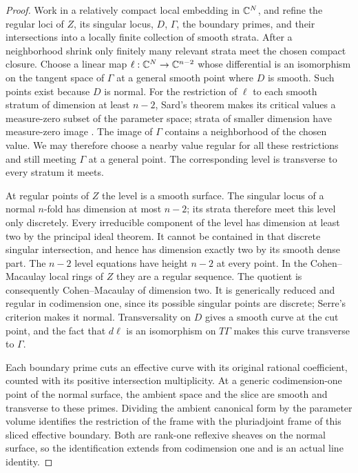 \begin{proof}
Work in a relatively compact local embedding in \(\mathbb C^N\), and refine
the regular loci of \(Z\), its singular locus, \(D\), \(\Gamma\), the
boundary primes, and their intersections into a locally finite collection
of smooth strata.  After a neighborhood shrink only finitely many relevant
strata meet the chosen compact closure.  Choose a linear map
\(\ell:\mathbb C^N\to\mathbb C^{n-2}\) whose differential is an isomorphism on
the tangent space of \(\Gamma\) at a general smooth point where \(D\)
is smooth.  Such points exist because \(D\) is normal.  For the restriction
of \(\ell\) to each smooth stratum of dimension at least \(n-2\),
Sard's theorem makes its critical values a measure-zero subset of the
parameter space; strata of smaller dimension have measure-zero image
\cite{Sard1942}.  The image of \(\Gamma\) contains a neighborhood of the
chosen value.  We may therefore choose a nearby value regular for all
these restrictions and still meeting \(\Gamma\) at a general point.
The corresponding level is transverse to every stratum it meets.

At regular points of \(Z\) the level is a smooth surface.  The singular
locus of a normal \(n\)-fold has dimension at most \(n-2\); its strata
therefore meet this level only discretely.  Every irreducible component
of the level has dimension at least two by the principal ideal theorem.
It cannot be contained in that discrete singular intersection, and hence
has dimension exactly two by its smooth dense part.  The \(n-2\) level
equations have height \(n-2\) at every point.  In the Cohen--Macaulay local
rings of \(Z\) they are a regular sequence.  The quotient is consequently
Cohen--Macaulay of dimension two.  It is generically reduced and regular
in codimension one, since its possible singular points are discrete;
Serre's criterion makes it normal.  Transversality on \(D\) gives a smooth
curve at the cut point, and the fact that \(d\ell\) is an isomorphism on
\(T\Gamma\) makes this curve transverse to \(\Gamma\).

Each boundary prime cuts an effective curve with its original rational
coefficient, counted with its positive intersection multiplicity.  At a
generic codimension-one point of the normal surface, the ambient space
and the slice are smooth and transverse to these primes.  Dividing the
ambient canonical form by the parameter volume identifies the
restriction of the frame with the pluriadjoint frame of this sliced
effective boundary.  Both are rank-one reflexive sheaves on the normal
surface, so the identification extends from codimension one and is an
actual line identity.


\end{proof}
